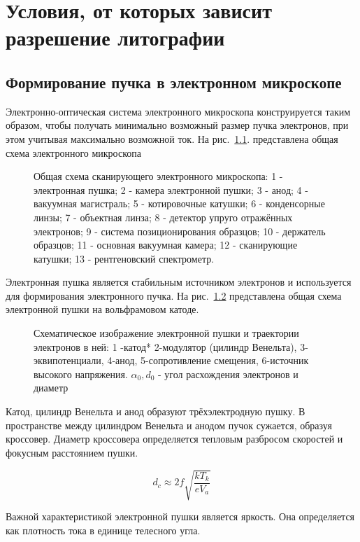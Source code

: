 \chapter{Условия, от которых зависит разрешение литографии}
\section{Формирование пучка в электронном микроскопе}

Электронно-оптическая система электронного микроскопа конструируется таким образом, чтобы получать минимально возможный размер пучка электронов, при этом учитывая максимально возможной ток. На рис.~\ref{fig:1}. представлена общая схема электронного микроскопа

\begin{figure}[H]
\center
\caption{Общая схема сканирующего электронного микроскопа: 1 - электронная пушка; 2 - камера электронной пушки; 3 - анод; 4 - вакуумная магистраль; 5 - котировочные катушки; 6 - конденсорные линзы; 7 - объектная линза; 8 - детектор упруго отражённых электронов; 9 - система позиционирования образцов; 10 - держатель образцов; 11 - основная вакуумная камера; 12 - сканирующие катушки; 13 - рентгеновский спектрометр.}
\label{fig:1}
\end{figure}

Электронная пушка является стабильным источником электронов и используется для формирования электронного пучка. На рис.~\ref{fig:2} представлена общая схема электронной пушки на вольфрамовом катоде.

\begin{figure}[H]
\center
\caption{ Схематическое изображение электронной пушки и траектории электронов в ней: 1 -катод* 2-модулятор (цилиндр Венельта), 3- эквипотенциали, 4-анод, 5-сопротивление смещения, 6-источник высокого напряжения. $\alpha_0, d_0$ - угол расхождения электронов и диаметр}
\label{fig:2}
\end{figure}

Катод, цилиндр Венельта и анод образуют трёхэлектродную пушку. В пространстве между цилиндром Венельта и анодом пучок сужается, образуя кроссовер.
Диаметр кроссовера определяется тепловым разбросом скоростей и фокусным расстоянием пушки.

\begin{equation}
d_c \approx 2f \sqrt{\frac{kT_k}{eV_a}}
\label{eq:A1}
\end{equation}

Важной характеристикой электронной пушки является яркость. Она определяется как плотность тока в единице телесного угла.

